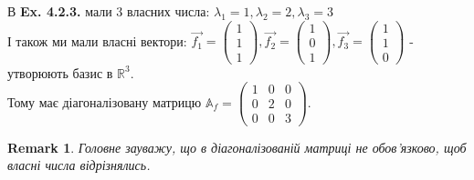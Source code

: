 \documentclass[a4paper, 10pt]{article}
\theoremstyle{theoremdd}
\theoremstyle{theoremdd}
\theoremstyle{theoremdd}
\theoremstyle{theoremdd}
\theoremstyle{theoremdd}
\theoremstyle{theoremdd}
\newtheorem{remark}[theorem]{Remark}
\theoremstyle{theoremdd}
\theoremstyle{theoremdd}
\begin{document}
В \textbf{Ex. 4.2.3.} мали 3 власних числа: $\lambda_1 = 1, \lambda_2 = 2,\lambda_3 = 3$\\
І також ми мали власні вектори: $\vec{f_1} = \begin{pmatrix}
1 \\ 1 \\ 1
\end{pmatrix}, \vec{f_2} = \begin{pmatrix}
1 \\ 0 \\ 1
\end{pmatrix}, \vec{f_3} = \begin{pmatrix}
1 \\ 1 \\ 0
\end{pmatrix}$ - утворюють базис в $\mathbb{R}^3$.\\
Тому має діагоналізовану матрицю $\mathbb{A}_f = \begin{pmatrix}
1 & 0 & 0 \\
0 & 2 & 0 \\
0 & 0 & 3
\end{pmatrix}$.
\iffalse
Ба більше, ми можемо розкрити деякі цікаві факти\\
\begin{tikzcd}
\mathbb{R}^3_f \arrow{r}{\mathbb{A}_f} \arrow{d}[swap]{U} & \mathbb{R}^3_f \arrow{d}{U} \\
\mathbb{R}^3_e \arrow{r}{A} & \mathbb{R}^3_e
\end{tikzcd}\\
Тут $U = \begin{pmatrix}
1 & 1 & 1 \\
1 & 0 & 1 \\
1 & 1 & 0 \\
\end{pmatrix}$\\
З картинки можна знайти:\\
$A = U \mathbb{A}_f U^{-1}$\\
$A^2 = A\cdot A = U \mathbb{A}_f U^{-1} U \mathbb{A}_f U^{-1} = U \mathbb{A}_f^2 U^{-1}$\\
$A^3 = A^2 \cdot A = U \mathbb{A}^2_f U^{-1} U \mathbb{A}_f U^{-1} = U \mathbb{A}_f^3 U^{-1}$\\
Ну і т.д.
\fi
\begin{remark}
Головне зауважу, що в діагоналізованій матриці не обов'язково, щоб власні числа відрізнялись.
\end{remark}
\end{document}

